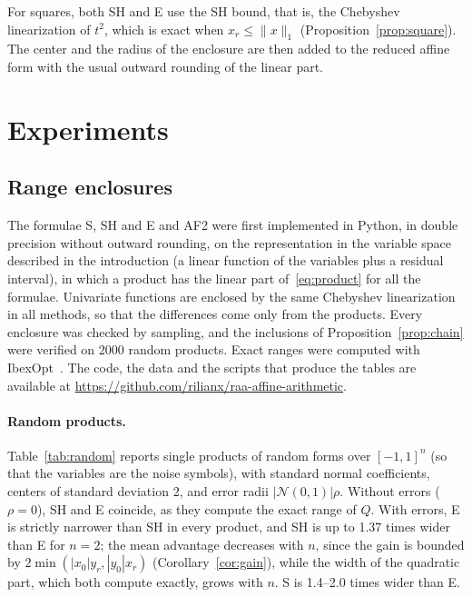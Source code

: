 \documentclass[10pt]{article}
\theoremstyle{definition}
\begin{document}
For squares, both SH and E use the SH bound, that is, the Chebyshev linearization of $t^2$, which is exact when $x_r\le\|x\|_1$ (Proposition~\ref{prop:square}). The center and the radius of the enclosure are then added to the reduced affine form with the usual outward rounding of the linear part.

\section{Experiments}
\label{sec:experiments}

\subsection{Range enclosures}

The formulae S, SH and E and AF2 were first implemented in Python, in double precision without outward rounding, on the representation in the variable space described in the introduction (a linear function of the variables plus a residual interval), in which a product has the linear part of~\eqref{eq:product} for all the formulae. Univariate functions are enclosed by the same Chebyshev linearization in all methods, so that the differences come only from the products. Every enclosure was checked by sampling, and the inclusions of Proposition~\ref{prop:chain} were verified on 2000 random products. Exact ranges were computed with IbexOpt~\cite{chabert2009}. The code, the data and the scripts that produce the tables are available at \url{https://github.com/rilianx/raa-affine-arithmetic}.

\paragraph{Random products.} Table~\ref{tab:random} reports single products of random forms over $[-1,1]^n$ (so that the variables are the noise symbols), with standard normal coefficients, centers of standard deviation 2, and error radii $|\mathcal N(0,1)|\rho$. Without errors ($\rho=0$), SH and E coincide, as they compute the exact range of $Q$. With errors, E is strictly narrower than SH in every product, and SH is up to 1.37 times wider than E for $n=2$; the mean advantage decreases with $n$, since the gain is bounded by $2\min(|x_0|y_r,|y_0|x_r)$ (Corollary~\ref{cor:gain}), while the width of the quadratic part, which both compute exactly, grows with $n$. S is 1.4--2.0 times wider than E.


\end{document}
